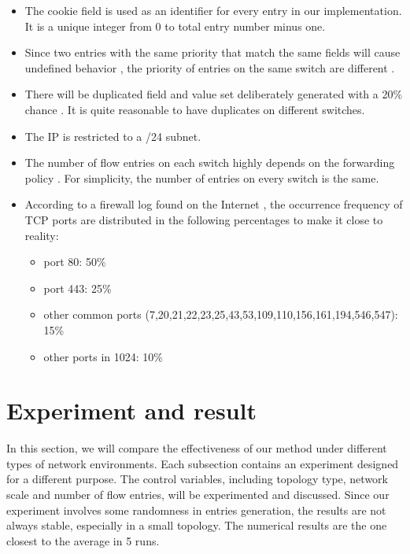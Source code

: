 \begin{itemize}
\item 
The cookie field is used as an identifier for every entry in our implementation. It is a unique integer from 0 to total entry number minus one.\sout{}
\item
Since two entries with the same priority that match the same fields will cause undefined behavior \cite{OF_SPEC}, the priority of entries on the same switch are different .
\item
There will be duplicated field and value set deliberately generated with a 20\% chance . It is quite reasonable to have duplicates on different switches. 
\item
The IP is restricted to a /24 subnet.
\item
The number of flow entries on each switch highly depends on the forwarding policy \cite{MPFHMRSV09}. For simplicity, the number of entries on every switch is the same. 
\item
According to a firewall log found on the Internet \cite{PORT_FREQ}, the occurrence frequency of TCP ports are distributed in the following percentages to make it close to reality:
\begin{itemize}
\item
port 80: 50\%
\item
port 443: 25\%
\item
other common ports (7,20,21,22,23,25,43,53,109,110,156,161,194,546,547): 15\%
\item
other ports in 1024: 10\%
\end{itemize}
\end{itemize}

\section{Experiment and result}
In this section, we will compare the effectiveness of our method under different types of network environments. Each subsection contains an experiment designed for a different purpose. The control variables, including topology type, network scale and number of flow entries, will be experimented and discussed. Since our experiment involves some randomness in entries generation, the results are not always stable, especially in a small topology. The numerical results are the one closest to the average in 5 runs.

